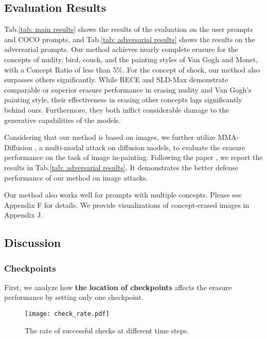 




\subsection{Evaluation Results}

Tab.\ref{tab: main results} shows the results of the evaluation on the user prompts and COCO prompts, and Tab.\ref{tab: adversarial results} shows the results on the adversarial prompts. Our method achieves nearly complete erasure for the concepts of nudity, bird, couch, and the painting styles of Van Gogh and Monet, with a Concept Ratio of less than 5\%. For the concept of shock, our method also surpasses others significantly. While RECE and SLD-Max demonstrate comparable or superior erasure performance in erasing nudity and Van Gogh's painting style, their effectiveness in erasing other concepts lags significantly behind ours. Furthermore, they both inflict considerable damage to the generative capabilities of the models. 

Considering that our method is based on images, we further utilize MMA-Diffusion \cite{yang2024mma}, a multi-modal attack on diffusion models, to evaluate the erasure performance on the task of image in-painting. Following the paper \cite{yang2024mma}, we report the results in Tab.\ref{tab: adversarial results}. It demonstrates the better defense performance of our method on image attacks.

Our method also works well for prompts with multiple concepts. Please see Appendix F for details. We provide visualizations of concept-erased images in Appendix J. 


\subsection{Discussion}
\subsubsection{Checkpoints}
First, we analyze how \textbf{the location of checkpoints} affects the erasure performance by setting only one checkpoint. 

\begin{figure}
    \centering
    \hspace{-0.5cm}
    \texttt{[image: check\_rate.pdf]}
    \caption{The rate of successful checks at different time steps.}
    \label{fig: check rate}
\end{figure}





